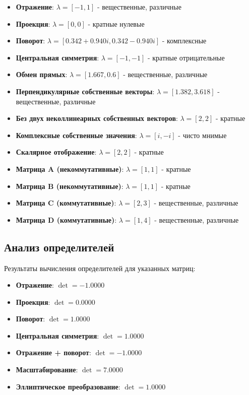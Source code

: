 \begin{itemize}
\item \textbf{Отражение}: $\lambda = [-1, 1]$ - вещественные, различные
\item \textbf{Проекция}: $\lambda = [0, 0]$ - кратные нулевые
\item \textbf{Поворот}: $\lambda = [0.342 + 0.940i, 0.342 - 0.940i]$ - комплексные
\item \textbf{Центральная симметрия}: $\lambda = [-1, -1]$ - кратные отрицательные
\item \textbf{Обмен прямых}: $\lambda = [1.667, 0.6]$ - вещественные, различные
\item \textbf{Перпендикулярные собственные векторы}: $\lambda = [1.382, 3.618]$ - вещественные, различные
\item \textbf{Без двух неколлинеарных собственных векторов}: $\lambda = [2, 2]$ - кратные
\item \textbf{Комплексные собственные значения}: $\lambda = [i, -i]$ - чисто мнимые
\item \textbf{Скалярное отображение}: $\lambda = [2, 2]$ - кратные
\item \textbf{Матрица A (некоммутативные)}: $\lambda = [1, 1]$ - кратные
\item \textbf{Матрица B (некоммутативные)}: $\lambda = [1, 1]$ - кратные
\item \textbf{Матрица C (коммутативные)}: $\lambda = [2, 3]$ - вещественные, различные
\item \textbf{Матрица D (коммутативные)}: $\lambda = [1, 4]$ - вещественные, различные
\end{itemize}

\subsection*{Анализ определителей}

Результаты вычисления определителей для указанных матриц:

\begin{itemize}
\item \textbf{Отражение}: $\det = -1.0000$
\item \textbf{Проекция}: $\det = 0.0000$
\item \textbf{Поворот}: $\det = 1.0000$
\item \textbf{Центральная симметрия}: $\det = 1.0000$
\item \textbf{Отражение + поворот}: $\det = -1.0000$
\item \textbf{Масштабирование}: $\det = 7.0000$
\item \textbf{Эллиптическое преобразование}: $\det = 1.0000$
\end{itemize}

